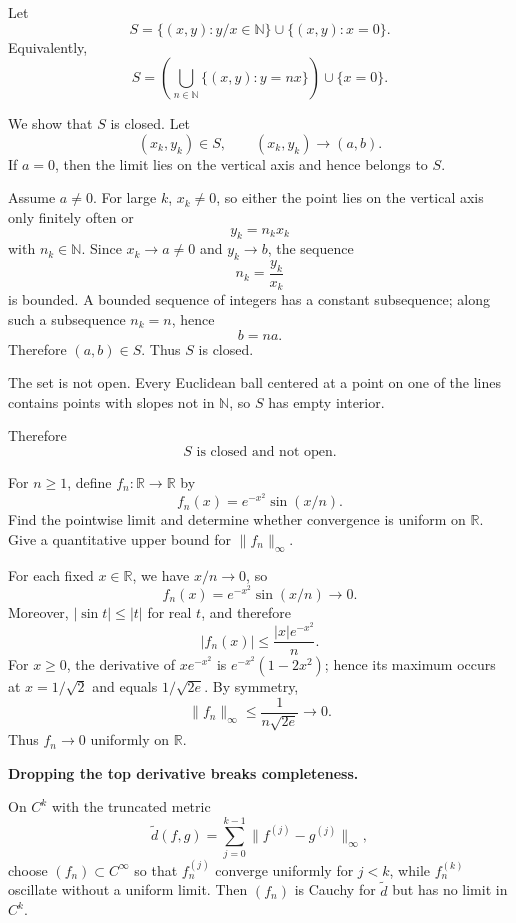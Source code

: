 \begin{solution}
Let
\[
S
=
\{(x,y):y/x\in\mathbb N\}
\cup
\{(x,y):x=0\}.
\]
Equivalently,
\[
S
=
\left(\bigcup_{n\in\mathbb N}\{(x,y):y=nx\}\right)
\cup
\{x=0\}.
\]

We show that \(S\) is closed. Let
\[
(x_k,y_k)\in S,
\qquad
(x_k,y_k)\to(a,b).
\]
If \(a=0\), then the limit lies on the vertical axis and hence belongs to \(S\).

Assume \(a\neq0\). For large \(k\), \(x_k\neq0\), so either the point lies on the vertical axis only finitely often or
\[
y_k=n_kx_k
\]
with \(n_k\in\mathbb N\). Since \(x_k\to a\neq0\) and \(y_k\to b\), the sequence
\[
n_k=\frac{y_k}{x_k}
\]
is bounded. A bounded sequence of integers has a constant subsequence; along such a subsequence \(n_k=n\), hence
\[
b=na.
\]
Therefore \((a,b)\in S\). Thus \(S\) is closed.

The set is not open. Every Euclidean ball centered at a point on one of the lines contains points with slopes not in \(\mathbb N\), so \(S\) has empty interior.

Therefore
\[
\boxed{S\text{ is closed and not open}.}
\]
\end{solution}


\begin{problem}[CP-IV-0057]
\label{prob:cp-iv-0057}
For $n\ge1$, define $f_n:\mathbb R\to\mathbb R$ by
\[
f_n(x)=e^{-x^2}\sin(x/n).
\]
Find the pointwise limit and determine whether convergence is uniform on
$\mathbb R$. Give a quantitative upper bound for $\|f_n\|_\infty$.
\end{problem}

\begin{solution}
For each fixed $x\in\mathbb R$, we have $x/n\to0$, so
\[
f_n(x)=e^{-x^2}\sin(x/n)\longrightarrow0.
\]
Moreover, $|\sin t|\le |t|$ for real $t$, and therefore
\[
|f_n(x)|\le \frac{|x|e^{-x^2}}{n}.
\]
For $x\ge0$, the derivative of $x e^{-x^2}$ is
$e^{-x^2}(1-2x^2)$; hence its maximum occurs at
$x=1/\sqrt2$ and equals $1/\sqrt{2e}$. By symmetry,
\[
\|f_n\|_\infty\le \frac{1}{n\sqrt{2e}}\longrightarrow0.
\]
Thus $f_n\to0$ uniformly on $\mathbb R$.
\end{solution}

\begin{problem}[CP-IV-0058]
\label{prob:cp-iv-0058}
\par\noindent\textbullet\quad \textbf{Dropping the top derivative breaks completeness.}

	On $C^k$ with the truncated metric
	\[
	\tilde d(f,g)=\sum_{j=0}^{k-1}\|f^{(j)}-g^{(j)}\|_\infty,
	\]
	choose $(f_n)\subset C^\infty$ so that $f_n^{(j)}$ converge uniformly for $j<k$,
	while $f_n^{(k)}$ oscillate without a uniform limit.
	Then $(f_n)$ is Cauchy for $\tilde d$ but has no limit in $C^k$.

	\medskip
\end{problem}

